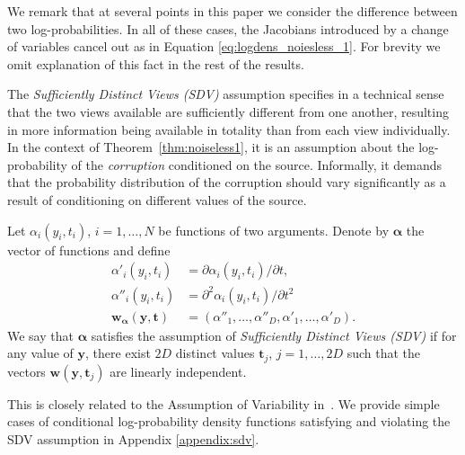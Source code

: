 \documentclass[letterpaper]{article}
\theoremstyle{definition}
\begin{document}
We remark that at several points in this paper we consider the difference between two log-probabilities.
In all of these cases, the Jacobians introduced by a change of variables cancel out as in Equation \ref{eq:logdens_noiesless_1}.
For brevity we omit explanation of this fact in the rest of the results.

The \emph{Sufficiently Distinct Views (SDV)} assumption specifies in a technical sense that the two views available are sufficiently different from one another,
resulting in more information being available in totality than from each view individually.
In the context of Theorem~\ref{thm:noiseless1}, it is an assumption about the log-probability of the \emph{corruption} conditioned on the source.
Informally, it demands that the probability distribution of the corruption should vary significantly as a result of conditioning on different values of the source.

\begin{definition}\label{suff_dist_assumption}
Let $\alpha_i(y_i, t_i)$, $i=1,\ldots, N$ be functions of two arguments.
Denote by $\bm\alpha$ the vector of functions and define
\begin{align}
\alpha'_{i}(y_i, t_i)&= \partial \alpha_{i}(y_i, t_i)/\partial t, \label{eq:convention1}\\
\alpha''_{i}(y_i, t_i)&=\partial^2 \alpha_{i}(y_i, t_i)/\partial t^2\, \label{eq:convention2}\\
\bm{w}_{\bm\alpha}(\bm{y}, \bm{t}) &= (\alpha''_{1}, \ldots, \alpha''_{D}, \alpha'_{1}, \ldots,\alpha'_{D}).
\end{align}
We say that $\bm{\alpha}$ satisfies the assumption of \emph{Sufficiently Distinct Views (SDV)} if for any value of $\bm{y}$, there exist $2D$ distinct values $\bm{t}_j$, $j=1, \ldots, 2D$ such that the vectors $\bm{w}(\bm{y},\bm{t}_j)$ are linearly independent.
    \\    \end{definition}
This is closely related to the Assumption of Variability in~\cite{hyvarinen19a}.
We provide simple cases of conditional log-probability density functions satisfying and violating the SDV assumption in Appendix \ref{appendix:sdv}.
\end{document}

